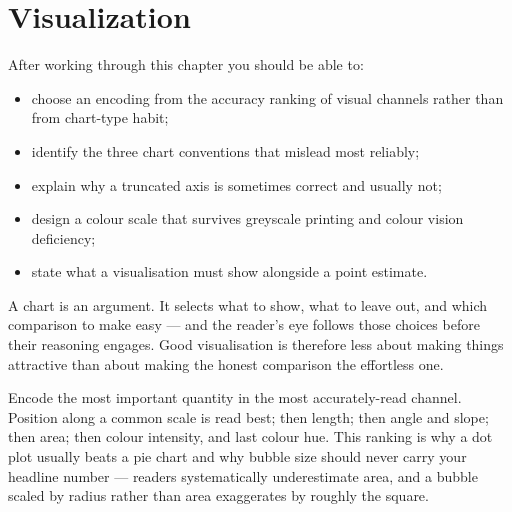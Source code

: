 
\chapter{Visualization}


\label{ch:visualization}

\begin{learningobjectives}
After working through this chapter you should be able to:
\begin{itemize}
  \item choose an encoding from the accuracy ranking of visual channels rather
        than from chart-type habit;
  \item identify the three chart conventions that mislead most reliably;
  \item explain why a truncated axis is sometimes correct and usually not;
  \item design a colour scale that survives greyscale printing and colour
        vision deficiency;
  \item state what a visualisation must show alongside a point estimate.
\end{itemize}
\end{learningobjectives}

\begin{plainlanguage}
A chart is an argument. It selects what to show, what to leave out, and which
comparison to make easy --- and the reader's eye follows those choices before
their reasoning engages. Good visualisation is therefore less about making
things attractive than about making the honest comparison the effortless one.
\end{plainlanguage}

\begin{engineernote}
Encode the most important quantity in the most accurately-read channel.
Position along a common scale is read best; then length; then angle and slope;
then area; then colour intensity, and last colour hue. This ranking is why a
dot plot usually beats a pie chart and why bubble size should never carry your
headline number --- readers systematically underestimate area, and a bubble
scaled by radius rather than area exaggerates by roughly the square.
\end{engineernote}


